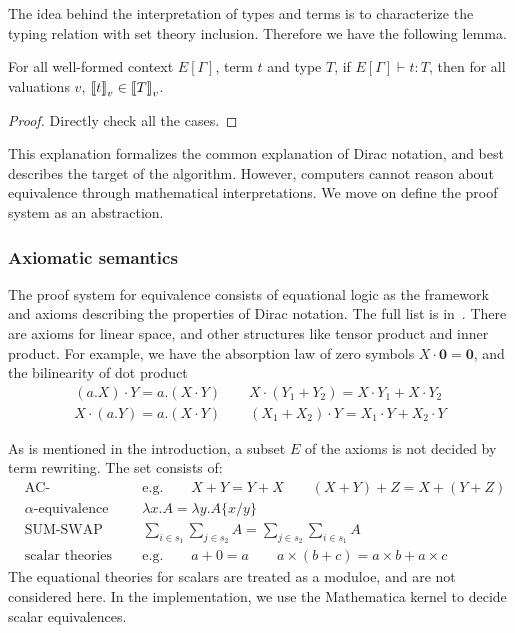\documentclass[runningheads]{llncs}
\begin{document}
The idea behind the interpretation of types and terms is to characterize the typing relation with set theory inclusion. Therefore we have the following lemma.
\begin{lemma}
    For all well-formed context $E[\Gamma]$, term $t$ and type $T$, if $E[\Gamma]\vdash t : T$, then for all valuations $v$, ${\llbracket t \rrbracket}_v \in {\llbracket T \rrbracket}_v$.
\end{lemma}
\begin{proof}
    Directly check all the cases.
\end{proof}

This explanation formalizes the common explanation of Dirac notation, and best describes the target of the algorithm.
However, computers cannot reason about equivalence through mathematical interpretations. We move on define the proof system as an abstraction.


\subsubsection{Axiomatic semantics} 
The proof system for equivalence consists of equational logic as the framework and axioms describing the properties of Dirac notation.
The full list is in~.
There are axioms for linear space, and other structures like tensor product and inner product.
For example, we have the absorption law of zero symbols $X \cdot \mathbf{0} = \mathbf{0}$, and the bilinearity of dot product
\begin{align*}
    (a.X) \cdot Y = a.(X \cdot Y) \qquad X \cdot (Y_1 + Y_2) = X \cdot Y_1 + X \cdot Y_2 \\
    X \cdot (a.Y) = a.(X \cdot Y) \qquad (X_1 + X_2) \cdot Y = X_1 \cdot Y + X_2 \cdot Y
\end{align*}

As is mentioned in the introduction, a subset $E$ of the axioms is not decided by term rewriting. The set consists of:
\begin{align*}
    & \textrm{AC-equivalence} 
    && \textrm{e.g.} \qquad X + Y = Y + X \qquad (X + Y) + Z = X + (Y + Z) \\
    & \textrm{$\alpha$-equivalence}
    && \lambda x . A = \lambda y . A\{x/y\} \\
    & \textrm{SUM-SWAP}
    && \sum_{i \in s_1} \sum_{j \in s_2} A = \sum_{j \in s_2} \sum_{i \in s_1} A \\
    & \textrm{scalar theories} 
    && \textrm{e.g.} \qquad a + 0 = a \qquad a \times (b + c) = a \times b + a \times c
\end{align*}
The equational theories for scalars are treated as a moduloe, and are not considered here. In the implementation, we use the Mathematica kernel to decide scalar equivalences.
\end{document}
